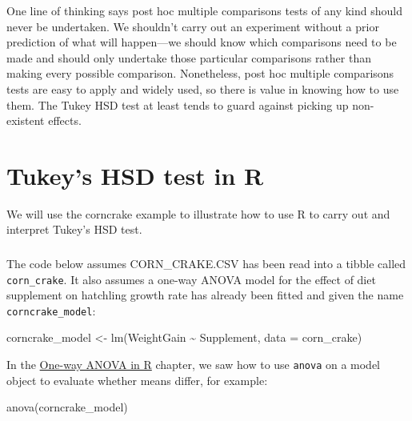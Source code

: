 \documentclass[
]{book}
\newenvironment{Shaded}{\begin{snugshade}}{\end{snugshade}}
\newcommand{\AttributeTok}[1]{\textcolor[rgb]{0.77,0.63,0.00}{#1}}
\newcommand{\FunctionTok}[1]{\textcolor[rgb]{0.00,0.00,0.00}{#1}}
\newcommand{\NormalTok}[1]{#1}
\newcommand{\OtherTok}[1]{\textcolor[rgb]{0.56,0.35,0.01}{#1}}
\newcommand{\SpecialCharTok}[1]{\textcolor[rgb]{0.00,0.00,0.00}{#1}}
\newenvironment{greybox}{
  \definecolor{shadecolor}{rgb}{0.95,0.95,0.95}  %
  \color{black}
  \begin{shaded}}
 {\end{shaded}}
\newenvironment{infobox}[1]
  {
  \begin{itemize}
  \renewcommand{\labelitemi}{
    \raisebox{-.7\height}[0pt][0pt]{
      {\setkeys{Gin}{width=3em,keepaspectratio}
        \texttt{[image: images/\#1]}}
    }
  }
  \setlength{\fboxsep}{1em}
  \begin{greybox}
  \item
  }
  {
  \end{greybox}
  \end{itemize}
  }
\begin{document}
One line of thinking says post hoc multiple comparisons tests of any kind should never be undertaken. We shouldn't carry out an experiment without a prior prediction of what will happen---we should know which comparisons need to be made and should only undertake those particular comparisons rather than making every possible comparison. Nonetheless, post hoc multiple comparisons tests are easy to apply and widely used, so there is value in knowing how to use them. The Tukey HSD test at least tends to guard against picking up non-existent effects.

\hypertarget{mult-comp-R}{%
\section{Tukey's HSD test in R}\label{mult-comp-R}}

We will use the corncrake example to illustrate how to use R to carry out and interpret Tukey's HSD test.

\begin{infobox}{action}

\hypertarget{section-9}{%
\subsubsection*{}\label{section-9}}

The code below assumes CORN\_CRAKE.CSV has been read into a tibble called \texttt{corn\_crake}. It also assumes a one-way ANOVA model for the effect of diet supplement on hatchling growth rate has already been fitted and given the name \texttt{corncrake\_model}:

\begin{Shaded}
\begin{Highlighting}[]
\NormalTok{corncrake\_model }\OtherTok{\textless{}{-}} \FunctionTok{lm}\NormalTok{(WeightGain }\SpecialCharTok{\textasciitilde{}}\NormalTok{ Supplement, }\AttributeTok{data =}\NormalTok{ corn\_crake)}
\end{Highlighting}
\end{Shaded}

\end{infobox}

In the \protect\hyperlink{one-way-anova-in-R}{One-way ANOVA in R} chapter, we saw how to use \texttt{anova} on a model object to evaluate whether means differ, for example:

\begin{Shaded}
\begin{Highlighting}[]
\FunctionTok{anova}\NormalTok{(corncrake\_model)}
\end{Highlighting}
\end{Shaded}
\end{document}
